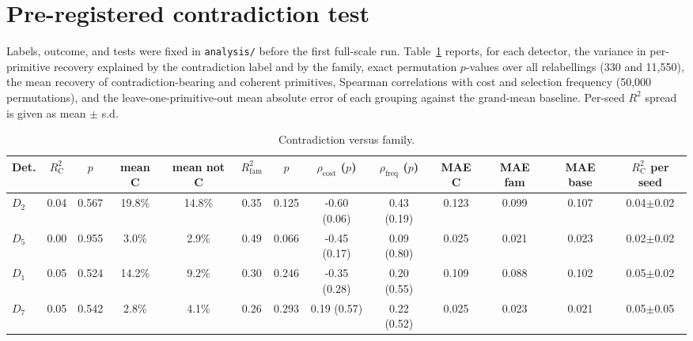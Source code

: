 \documentclass[conference]{IEEEtran}
\begin{document}
\section{Pre-registered contradiction test}
Labels, outcome, and tests were fixed in \texttt{analysis/} before the first
full-scale run. Table~\ref{tab:ct} reports, for each detector, the variance
in per-primitive recovery explained by the contradiction label and by the
family, exact permutation $p$-values over all relabellings (330 and 11,550),
the mean recovery of contradiction-bearing and coherent primitives, Spearman
correlations with cost and selection frequency (50,000 permutations), and the
leave-one-primitive-out mean absolute error of each grouping against the
grand-mean baseline. Per-seed $R^2$ spread is given as mean $\pm$ s.d.
\begin{table}[t]\caption{Contradiction versus family.}\label{tab:ct}\centering\scriptsize\setlength{\tabcolsep}{2.5pt}
\begin{tabular}{@{}lcccccccccccc@{}}\toprule
Det. & $R^2_{\mathrm{C}}$ & $p$ & mean C & mean not C & $R^2_{\mathrm{fam}}$ & $p$ & $\rho_{\mathrm{cost}}$ ($p$) & $\rho_{\mathrm{freq}}$ ($p$) & MAE C & MAE fam & MAE base & $R^2_{\mathrm{C}}$ per seed \\\midrule
$D_2$ & 0.04 & 0.567 & 19.8\% & 14.8\% & 0.35 & 0.125 & -0.60 (0.06) & 0.43 (0.19) & 0.123 & 0.099 & 0.107 & 0.04$\pm$0.02 \\
$D_5$ & 0.00 & 0.955 & 3.0\% & 2.9\% & 0.49 & 0.066 & -0.45 (0.17) & 0.09 (0.80) & 0.025 & 0.021 & 0.023 & 0.02$\pm$0.02 \\
$D_1$ & 0.05 & 0.524 & 14.2\% & 9.2\% & 0.30 & 0.246 & -0.35 (0.28) & 0.20 (0.55) & 0.109 & 0.088 & 0.102 & 0.05$\pm$0.02 \\
$D_7$ & 0.05 & 0.542 & 2.8\% & 4.1\% & 0.26 & 0.293 & 0.19 (0.57) & 0.22 (0.52) & 0.025 & 0.023 & 0.021 & 0.05$\pm$0.05 \\
\bottomrule\end{tabular}\end{table}
\end{document}
